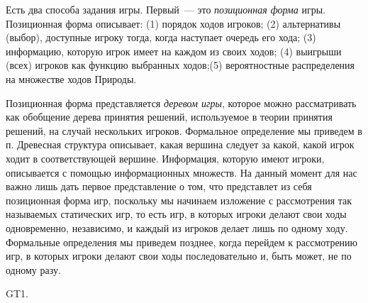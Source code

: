 \documentclass[12pt]{article}
\begin{document}
Есть два способа задания игры. Первый~--- это {\it позиционная
форма} игры. Позиционная форма описывает: (1) порядок ходов игроков;
(2) альтернативы (выбор), доступные игроку тогда, когда наступает
очередь его хода;
(3) информацию, которую игрок имеет на каждом из своих ходов; (4)
выигрыши (всех) игроков как функцию выбранных ходов;(5)
вероятностные распределения на множестве ходов Природы.

Позиционная форма представляется {\it деревом игры}, которое можно
рассматривать как обобщение дерева принятия решений, используемое в
теории принятия решений, на случай нескольких игроков. Формальное
определение мы приведем в п.      Древесная структура описывает,
какая вершина следует за какой, какой игрок ходит в соответствующей
вершине. Информация, которую имеют игроки, описывается с помощью
информационных множеств. На данный момент для нас
важно лишь дать первое представление о том, что представлет из
себя позиционная форма игр, поскольку мы начинаем изложение с
рассмотрения так называемых статических игр, то есть игр, в которых
игроки делают свои ходы одновременно, независимо, и каждый из игроков
делает лишь по одному ходу. Формальные определения мы приведем позднее,
когда перейдем к рассмотрению игр, в которых игроки делают свои ходы
последовательно и, быть может, не по одному разу.

GT1.
\end{document}
